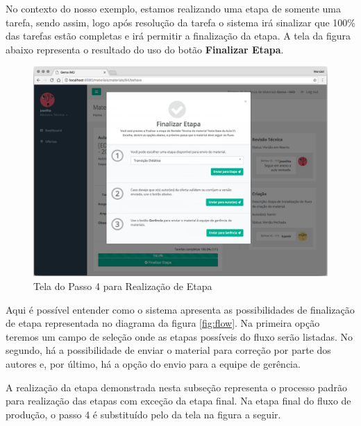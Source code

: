 No contexto do nosso exemplo, estamos realizando uma etapa de somente uma tarefa, sendo assim, logo após resolução da tarefa o sistema irá sinalizar que 100\% das tarefas estão completas e irá permitir a finalização da etapa. A tela da figura abaixo representa o resultado do uso do botão \textbf{Finalizar Etapa}.

\begin{figure}[H]
\centering
     \includegraphics[width=1.0\textwidth]{Screens/BehaveMaterial4.png}
      \caption{Tela do Passo 4 para Realização de Etapa}
       \label{fig:BehaveMaterial4}
\end{figure}

Aqui é possível entender como o sistema apresenta as possibilidades de finalização de etapa representada no diagrama da figura \hyperref[fig:flow]{\ref{fig:flow}}. Na primeira opção teremos um campo de seleção onde as etapas possíveis do fluxo serão listadas. No segundo, há a possibilidade de enviar o material para correção por parte dos autores e, por último, há a opção do envio para a equipe de gerência.

A realização da etapa demonstrada nesta subseção representa o processo padrão para realização das etapas com exceção da etapa final. Na etapa final do fluxo de produção, o passo 4 é substituído pelo da tela na figura a seguir.

